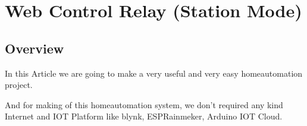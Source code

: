\documentclass[a4paper,11pt,english]{sphinxmanual}
\begin{document}
\begin{enumerate}
\begin{enumerate}
\begin{sphinxVerbatim}[commandchars=\\\{\}]
\end{sphinxVerbatim}

\end{enumerate}

\end{enumerate}

\sphinxAtStartPar
{}

\sphinxAtStartPar
{}

\sphinxstepscope


\section{Web Control Relay (Station Mode)}
\label{\detokenize{Extension_Project/Web_Control_Relay:web-control-relay-station-mode}}\label{\detokenize{Extension_Project/Web_Control_Relay:ext-web-control-relay}}\label{\detokenize{Extension_Project/Web_Control_Relay::doc}}

\subsection{Overview}
\label{\detokenize{Extension_Project/Web_Control_Relay:overview}}
\sphinxAtStartPar
In this Article we are going to make a very useful and very easy home\sphinxhyphen{}automation project.

\sphinxAtStartPar
And for making of this home\sphinxhyphen{}automation system, we don’t required any kind Internet and IOT Platform like blynk, ESP\sphinxhyphen{}Rainmeker, Arduino IOT Cloud.
\end{document}
